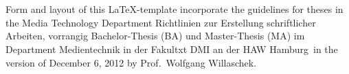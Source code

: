 



\usepackage[utf8]{inputenc} %



%



\newcommand{\vorname}{Julius}
\newcommand{\nachname}{Neudecker}
\newcommand{\matrikelnummer}{2025850}

\newcommand{\titel}{{[Working Title] Using a neural interface for interaction in virtual reality}\\[0.2ex] 
				\Large an HCI study}

\newcommand{\erstpruef}{Prof. Dr.Roland Greule}
\newcommand{\zweitpruef}{Dipl. Inf. Rüdiger Höfert}

\date{\sffamily Hamburg, 30.06.2021}  %



\maketitle           %
\tableofcontents %
\clearpage          %



\thispagestyle{empty}
\section*{\centering\abstractname}
Form and layout of this \LaTeX-template incorporate the guidelines for theses in the Media Technology Department \glqq Richtlinien zur Erstellung schriftlicher Arbeiten, vorrangig Bachelor-Thesis (BA) und Master-Thesis (MA) im Department Medientechnik in der Fa\-kul\-txt DMI an der HAW Hamburg\grqq\ in the version of December 6, 2012 by Prof.\ Wolfgang Willaschek. 

